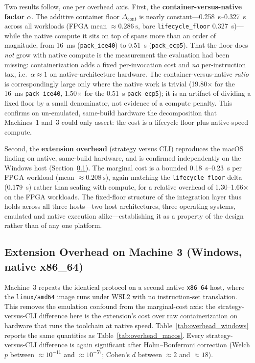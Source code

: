 Two results follow, one per overhead axis. First, the \textbf{container-versus-native factor $\alpha$}. The additive container floor $\Delta_{\mathrm{cont}}$ is nearly constant---\SIrange{0.258}{0.327}{\second} across all workloads (FPGA mean $\approx \SI{0.286}{\second}$, bare \texttt{lifecycle\_floor} \SI{0.327}{\second})---while the native compute it sits on top of spans more than an order of magnitude, from \SI{16}{\milli\second} (\texttt{pack\_ice40}) to \SI{0.51}{\second} (\texttt{pack\_ecp5}). That the floor does \emph{not} grow with native compute is the measurement the evaluation had been missing: containerization adds a fixed per-invocation cost and \emph{no} per-instruction tax, i.e.\ $\alpha \approx 1$ on native-architecture hardware. The container-versus-native \emph{ratio} is correspondingly large only where the native work is trivial (\num{19.80}$\times$ for the \SI{16}{\milli\second} \texttt{pack\_ice40}, \num{1.50}$\times$ for the \SI{0.51}{\second} \texttt{pack\_ecp5}); it is an artifact of dividing a fixed floor by a small denominator, not evidence of a compute penalty. This confirms on un-emulated, same-build hardware the decomposition that Machines~1 and~3 could only assert: the cost is a lifecycle floor plus native-speed compute.

Second, the \textbf{extension overhead} (strategy versus CLI) reproduces the macOS finding on native, same-build hardware, and is confirmed independently on the Windows host (Section~\ref{subsec:overhead_windows}). The marginal cost is a bounded \SIrange{0.18}{0.23}{\second} per FPGA workload (mean $\approx \SI{0.208}{\second}$), again matching the \texttt{lifecycle\_floor} delta (\SI{0.179}{\second}) rather than scaling with compute, for a relative overhead of \numrange{1.30}{1.66}$\times$ on the FPGA workloads. The fixed-floor structure of the integration layer thus holds across all three hosts---two host architectures, three operating systems, emulated and native execution alike---establishing it as a property of the design rather than of any one platform.

\subsection{Extension Overhead on Machine 3 (Windows, native x86\_64)}
\label{subsec:overhead_windows}
Machine~3 repeats the identical protocol on a second native \texttt{x86\_64} host, where the \texttt{linux/amd64} image runs under WSL2 with no instruction-set translation. This removes the emulation confound from the marginal-cost axis: the strategy-versus-CLI difference here is the extension's cost over raw containerization on hardware that runs the toolchain at native speed. Table~\ref{tab:overhead_windows} reports the same quantities as Table~\ref{tab:overhead_macos}. Every strategy-versus-CLI difference is again significant after Holm--Bonferroni correction (Welch $p$ between $\approx 10^{-11}$ and $\approx 10^{-57}$; Cohen's $d$ between $\approx 2$ and $\approx 18$).

